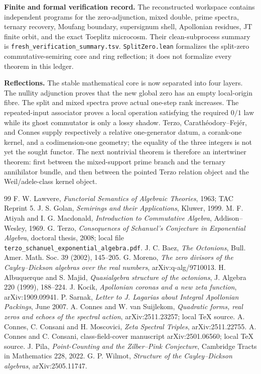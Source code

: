 \documentclass[11pt]{article}
\begin{document}
\noindent\textbf{Finite and formal verification record.}
The reconstructed workspace contains independent programs for the zero-adjunction, mixed double, prime spectra, ternary recovery, Moufang boundary, supersignum shell, Apollonian residues, JT finite orbit, and the exact Toeplitz microcosm.  Their clean-subprocess summary is \texttt{fresh\_verification\_summary.tsv}.  \texttt{SplitZero.lean} formalizes the split-zero commutative-semiring core and ring reflection; it does not formalize every theorem in this ledger.

\noindent\textbf{Reflections.}
The stable mathematical core is now separated into four layers.  The nullity adjunction proves that the new global zero has an empty local-origin fibre.  The split and mixed spectra prove actual one-step rank increases.  The repeated-input associator proves a local operation satisfying the required $0/1$ law while its ghost commutator is only a lossy shadow.  Terzo, Carath\'eodory--Fej\'er, and Connes supply respectively a relative one-generator datum, a corank-one kernel, and a codimension-one geometry; the equality of the three integers is not yet the sought functor.  The next nontrivial theorem is therefore an intertwiner theorem: first between the mixed-support prime branch and the ternary annihilator bundle, and then between the pointed Terzo relation object and the Weil/adele-class kernel object.

\begin{thebibliography}{99}
 F. W. Lawvere, \emph{Functorial Semantics of Algebraic Theories}, 1963; TAC Reprint 5.
 J. S. Golan, \emph{Semirings and their Applications}, Kluwer, 1999.
 M. F. Atiyah and I. G. Macdonald, \emph{Introduction to Commutative Algebra}, Addison--Wesley, 1969.
 G. Terzo, \emph{Consequences of Schanuel's Conjecture in Exponential Algebra}, doctoral thesis, 2008; local file \texttt{terzo\_schanuel\_exponential\_algebra.pdf}.
 J. C. Baez, \emph{The Octonions}, Bull. Amer. Math. Soc. 39 (2002), 145--205.
 G. Moreno, \emph{The zero divisors of the Cayley--Dickson algebras over the real numbers}, arXiv:q-alg/9710013.
 H. Albuquerque and S. Majid, \emph{Quasialgebra structure of the octonions}, J. Algebra 220 (1999), 188--224.
 J. Kocik, \emph{Apollonian coronas and a new zeta function}, arXiv:1909.09941.
 P. Sarnak, \emph{Letter to J. Lagarias about Integral Apollonian Packings}, June 2007.
 A. Connes and W. van Suijlekom, \emph{Quadratic forms, real zeros and echoes of the spectral action}, arXiv:2511.23257; local TeX source.
 A. Connes, C. Consani and H. Moscovici, \emph{Zeta Spectral Triples}, arXiv:2511.22755.
 A. Connes and C. Consani, class-field-cover manuscript arXiv:2501.06560; local TeX source.
 J. Pila, \emph{Point-Counting and the Zilber--Pink Conjecture}, Cambridge Tracts in Mathematics 228, 2022.
 G. P. Wilmot, \emph{Structure of the Cayley--Dickson algebras}, arXiv:2505.11747.
\end{thebibliography}
\end{document}

